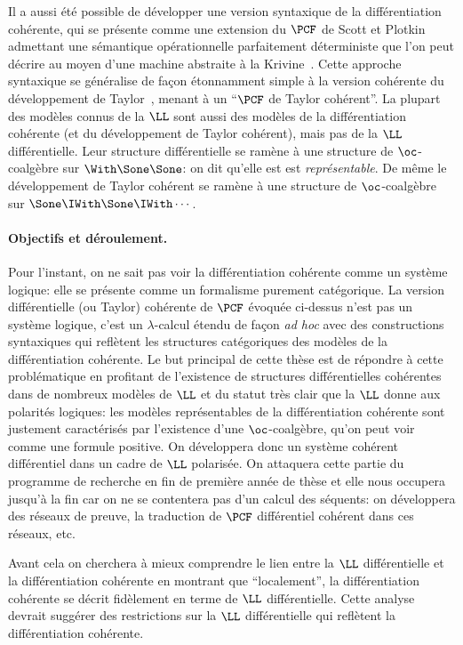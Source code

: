 \documentclass[a4]{article}
\begin{document}
Il a aussi été possible de développer une version syntaxique de la
diffé\-ren\-tia\-tion cohérente, qui se présente comme une extension du
$\PCF$ de Scott et Plotkin admettant une sémantique
opérationnelle parfaitement déterministe que l'on peut décrire au
moyen d'une machine abstraite à la Krivine~\cite{Ehrhard23b}.
%
Cette approche syntaxique se généralise de façon étonnamment simple à
la version cohérente du développement de
Taylor~\cite{EhrhardWalch23b}, menant à un ``$\PCF$ de Taylor
cohérent''.
%
La plupart des modèles connus de la $\LL$ sont aussi des modèles de la
différentiation cohérente (et du développement de Taylor cohérent),
mais pas de la $\LL$ différentielle.
%
Leur structure différentielle se ramène à une structure de
$\oc$-coalgèbre sur $\With\Sone\Sone$: on dit qu'elle est
est \emph{représentable}.
%
De même le développement de Taylor cohérent se ramène à une structure
de $\oc$-coalgèbre sur $\Sone\IWith\Sone\IWith\cdots$.

\paragraph*{Objectifs et déroulement.}
Pour l'instant, on ne sait pas voir la différentiation cohérente comme
un système logique: elle se présente comme un formalisme purement
catégorique.
%
La version différentielle (ou Taylor) cohérente de $\PCF$ évoquée
ci-dessus n'est pas un système logique, c'est un $\lambda$-calcul
étendu de façon \emph{ad hoc} avec des constructions syntaxiques qui
reflètent les structures catégoriques des modèles de la
différentiation cohérente.
%
Le but principal de cette thèse est de répondre à cette problématique
en profitant de l'existence de structures différentielles cohérentes
dans de nombreux modèles de $\LL$ et du statut très clair que la $\LL$
donne aux polarités logiques: les modèles représentables de la
différentiation cohérente sont justement caractérisés par l'existence
d'une $\oc$-coalgèbre, qu'on peut voir comme une formule positive.
%
On développera donc un système cohérent différentiel dans un cadre de
$\LL$ polarisée.
%
On attaquera cette partie du programme de recherche en fin de première
année de thèse et elle nous occupera jusqu'à la fin car on ne se
contentera pas d'un calcul des séquents: on développera des réseaux de
preuve, la traduction de $\PCF$ différentiel cohérent dans ces réseaux,
etc.

Avant cela on cherchera à mieux comprendre le lien entre la $\LL$
différentielle et la différentiation cohérente en montrant que
``localement'', la différentiation cohérente se décrit fidèlement en
terme de $\LL$ différentielle.
%
%
Cette analyse devrait suggérer des restrictions sur la $\LL$
différentielle qui reflètent la différentiation cohérente.
\end{document}
